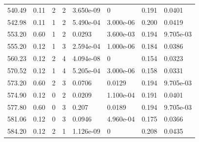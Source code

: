 \documentclass[preview]{standalone}
\begin{document}
{{{\begin{tabular}{L{1.2cm}C{1.2cm} C{0.3cm}C{0.5cm} C{1.4cm}C{1.4cm} C{1.4cm}C{1.4cm}}
  540.49  &  0.11  & 2     &  2 &  3.650e-09  & 0  & 0.191 &  0.0401   \\ 
  542.98  &  0.11  & 1     &  2 &  5.490e-04  & 3.000e-06  & 0.200 &  0.0419   \\ 
  553.20  &  0.60  & 1     &  2 &  0.0293  & 3.600e-03  & 0.194 &  9.705e-03   \\ 
  555.20  &  0.12  & 1     &  3 &  2.594e-04  & 1.000e-06  & 0.184 &  0.0386   \\ 
  560.23  &  0.12  & 2     &  4 &  4.094e-08  & 0  & 0.154 &  0.0323   \\ 
  570.52  &  0.12  & 1     &  4 &  5.205e-04  & 3.000e-06  & 0.158 &  0.0331   \\ 
  573.20  &  0.60  & 2     &  3 &  0.0706  & 0.0129  & 0.194 &  9.705e-03   \\ 
  574.90  &  0.12  & 0     &  2 &  0.0209  & 1.100e-04  & 0.191 &  0.0401   \\ 
  577.80  &  0.60  & 0     &  3 &  0.207  & 0.0189  & 0.194 &  9.705e-03   \\ 
  581.06  &  0.12  & 0     &  3 &  0.0946  & 4.960e-04  & 0.175 &  0.0366   \\ 
  584.20  &  0.12  & 2     &  1 &  1.126e-09  & 0  & 0.208 &  0.0435   \\ 
\hline 
\end{tabular} 

}}}
\end{document}
